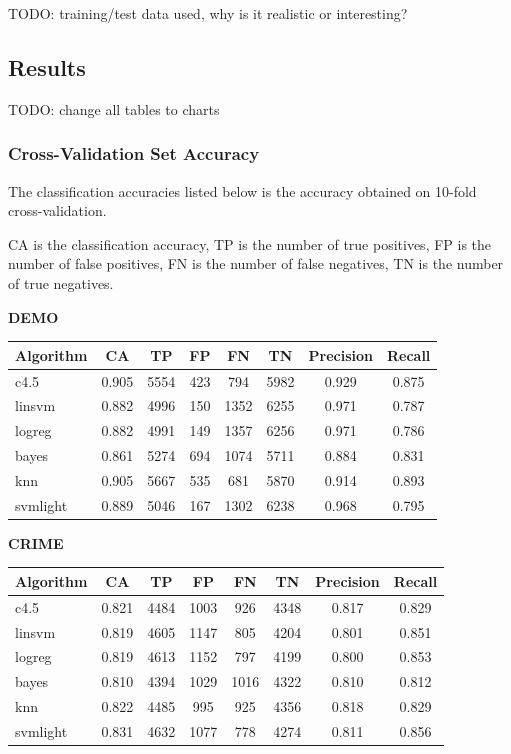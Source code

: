 \documentclass[11pt,letter]{article}
\begin{document}
TODO: training/test data used, why is it realistic or interesting?

\subsection{Results}
TODO: change all tables to charts
\subsubsection{Cross-Validation Set Accuracy}
The classification accuracies listed below is the accuracy obtained on 10-fold cross-validation.

CA is the classification accuracy, TP is the number of true positives, FP is the number of false positives, FN is the number of false negatives, TN is the number of true negatives.

\textbf{DEMO} \\
\begin{tabular}{|l|c|c|c|c|c|c|c|}
\hline
Algorithm & CA & TP & FP & FN & TN & Precision & Recall\\
\hline
c4.5   	 & 0.905 & 5554  & 423  &  794   & 5982 & 0.929 & 0.875\\
linsvm 	 & 0.882 & 4996  & 150  &  1352  & 6255 & 0.971 & 0.787\\
logreg 	 & 0.882 & 4991  & 149  &  1357  & 6256 & 0.971 & 0.786\\
bayes  	 & 0.861 & 5274  & 694  &  1074  & 5711 & 0.884 & 0.831\\
knn   & 0.905 & 5667  & 535  &  681   & 5870 & 0.914 & 0.893\\
svmlight & 0.889 & 5046  & 167	&  1302	 & 6238 & 0.968 & 0.795\\ 
\hline
\end{tabular}

\textbf{CRIME} \\
\begin{tabular}{|l|c|c|c|c|c|c|c|}
\hline
Algorithm & CA & TP & FP & FN & TN & Precision & Recall\\
\hline
c4.5     & 0.821  &  4484  &  1003  &  926   &  4348 & 0.817 & 0.829\\
linsvm   & 0.819  &  4605  &  1147  &  805   &  4204 & 0.801 & 0.851\\
logreg   & 0.819  &  4613  &  1152  &  797   &  4199 & 0.800 & 0.853\\
bayes    & 0.810  &  4394  &  1029  &  1016  &  4322 & 0.810 & 0.812\\
knn   & 0.822  &  4485  &  995   &  925   &  4356 & 0.818 & 0.829\\
svmlight & 0.831  &  4632  &  1077  &  778   &  4274 & 0.811 & 0.856\\
\hline
\end{tabular}
\end{document}
